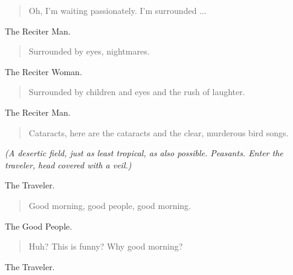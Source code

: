 \documentclass[letterpaper,article,12pt,oneside,notitlepage]{memoir}
\begin{document}
\begin{verse}
Oh, I'm waiting passionately. I'm surrounded ... \\
\end{verse}

\begin{center}The Reciter Man.\end{center}

\begin{verse}
Surrounded by eyes, nightmares. \\
\end{verse}

\begin{center}The Reciter Woman.\end{center}

\begin{verse}
Surrounded by children and eyes and the rush of laughter. \\
\end{verse}

\begin{center}The Reciter Man.\end{center}

\begin{verse}
Cataracts, here are the cataracts and the clear, murderous bird songs. \\
\end{verse}

\textit{(A desertic field, just as least tropical, as also possible. Peasants. Enter the traveler, head covered with a veil.)}

\begin{center}The Traveler.\end{center}

\begin{verse}
Good morning, good people, good morning. \\
\end{verse}

\clearpage

\begin{center}The Good People.\end{center}

\begin{verse}
Huh? This is funny? Why good morning? \\
\end{verse}

\begin{center}The Traveler.\end{center}
\end{document}
